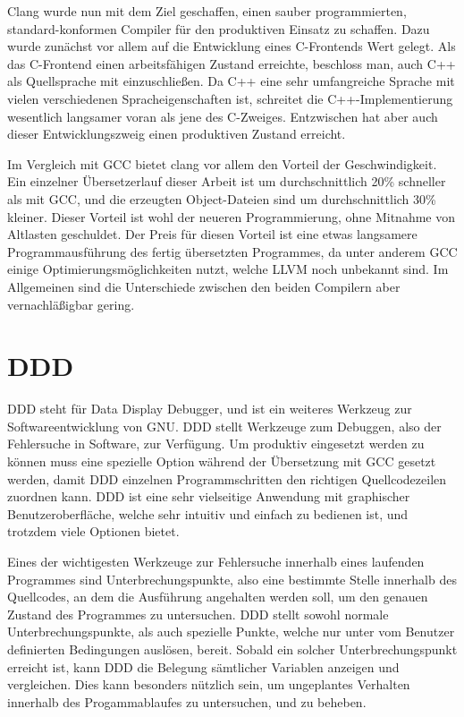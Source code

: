 Clang wurde nun mit dem Ziel geschaffen, einen sauber programmierten, standard-konformen Compiler für den produktiven Einsatz zu schaffen. Dazu wurde zunächst vor allem auf die Entwicklung eines C-Frontends
Wert gelegt. Als das C-Frontend einen arbeitsfähigen Zustand erreichte, beschloss man, auch C++ als Quellsprache mit einzuschließen. Da C++ eine sehr umfangreiche Sprache mit vielen verschiedenen Spracheigenschaften 
ist, schreitet die C++-Implementierung wesentlich langsamer voran als jene des C-Zweiges. Entzwischen hat aber auch dieser Entwicklungszweig einen produktiven Zustand erreicht. 

Im Vergleich mit GCC bietet clang vor allem den Vorteil der Geschwindigkeit. Ein einzelner Übersetzerlauf dieser Arbeit ist um durchschnittlich 20\% schneller als mit GCC, und die erzeugten Object-Dateien
sind um durchschnittlich 30\% kleiner. Dieser Vorteil ist wohl der neueren Programmierung, ohne Mitnahme von Altlasten geschuldet. Der Preis für diesen Vorteil ist eine etwas langsamere Programmausführung
des fertig übersetzten Programmes, da unter anderem GCC einige Optimierungsmöglichkeiten nutzt, welche LLVM noch unbekannt sind. Im Allgemeinen sind die Unterschiede zwischen den beiden Compilern aber
vernachläßigbar gering.

\section{DDD}
DDD steht für Data Display Debugger, und ist ein weiteres Werkzeug zur Softwareentwicklung von GNU. DDD stellt Werkzeuge zum Debuggen, also der Fehlersuche in Software, zur Verfügung. Um produktiv eingesetzt
werden zu können muss eine spezielle Option während der Übersetzung mit GCC gesetzt werden, damit DDD einzelnen Programmschritten den richtigen Quellcodezeilen zuordnen kann. DDD ist eine sehr vielseitige
Anwendung mit graphischer Benutzeroberfläche, welche sehr intuitiv und einfach zu bedienen ist, und trotzdem viele Optionen bietet.

Eines der wichtigesten Werkzeuge zur Fehlersuche innerhalb eines laufenden Programmes sind Unterbrechungspunkte, also eine bestimmte Stelle innerhalb des Quellcodes, an dem die Ausführung angehalten werden 
soll, um den genauen Zustand des Programmes zu untersuchen. DDD stellt sowohl normale Unterbrechungspunkte, als auch spezielle Punkte, welche nur unter vom Benutzer definierten Bedingungen auslösen, bereit.
Sobald ein solcher Unterbrechungspunkt erreicht ist, kann DDD die Belegung sämtlicher Variablen anzeigen und vergleichen. Dies kann besonders nützlich sein, um ungeplantes Verhalten innerhalb des
Progamm\-ablaufes zu untersuchen, und zu beheben. 

